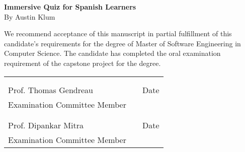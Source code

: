 \thispagestyle{empty}
\vspace*{0.3in}
\begin{center}
	\large{\textbf{Immersive Quiz for Spanish Learners}} \\ 
	\vspace{0.75in}
	\normalsize{By Austin Klum}
\end{center}

\vspace{0.5in}
\noindent We recommend acceptance of this manuscript in partial fulfillment of this candidate's requirements for the degree of Master of Software Engineering in Computer Science. The candidate has completed the oral examination requirement of the capstone project for the degree. \\

\noindent
\begin{tabularx}{\textwidth}{p{3in}Xp{2in}}
	\rule{0pt}{50pt} & & \\
	\hrulefill & & \hrulefill \\
	Prof. Thomas Gendreau & & Date \\
	Examination Committee Member & & \\
	\rule{0pt}{50pt} & & \\
	\hrulefill & & \hrulefill \\
	Prof. Dipankar Mitra & & Date \\
	Examination Committee Member & & \\
\end{tabularx}

